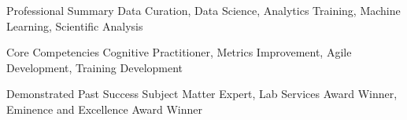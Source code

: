 

\begin{cvskills}

  \cvskill
    {Professional Summary} %
    {Data Curation, Data Science, Analytics Training, Machine Learning, Scientific Analysis} %

  \cvskill
    {Core Competencies} %
    {Cognitive Practitioner, Metrics Improvement, Agile Development, Training Development} %

  \cvskill
    {Demonstrated Past Success} %
    {Subject Matter Expert, Lab Services Award Winner, Eminence and Excellence Award Winner} %

\end{cvskills}